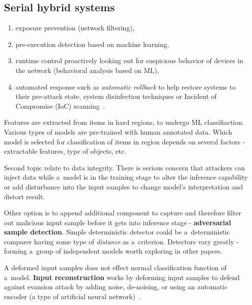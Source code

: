 \subsection{Serial hybrid systems}\label{subsec:serial-hybrid-systems}

\begin{enumerate}[label=(\roman*)]
    \item exposure prevention (network filtering),
    \item pre-execution detection based on machine learning,
    \item runtime control proactively looking out for suspicious behavior of devices in the network (behavioral analysis based on ML),
    \item automated response such as \textit{automatic rollback} to help restore systems to their pre-attack state, system disinfection techniques or Incident of Compromise (IoC) scanning~\cite{whitepaper:kaspersky_next_generation}.
\end{enumerate}

Features are extracted from items in hard regions, to undergo ML classifiaction.
Various types of models are pre-trained with human annotated data.
Which model is selected for classification of items in region depends on several factors - extractable features, type of objects, etc.

Second topic relate to data integrity.
There is serious concern that attackers can inject data while a~model is in the training stage to alter the inference capability or add disturbance into the input samples to change model's interpretation and distort result.

Other option is to append additional component to capture and therefore filter out malicious input sample before it gets into inference stage - \textbf{adversarial sample detection}.
Simple deterministic detector could be a~deterministic comparer having some type of \textit{distance} as a~criterion.
Detectors vary greatly - forming a~group of independent models worth exploring in other papers.

A deformed input samples does not effect normal classification function of a~model.
\textbf{Input reconstruction} works by deforming input samples to defend against evansion attack by adding noise, de-noising, or using an automatic encoder (a type of artificial neural network)~\cite{huawei_security}.


